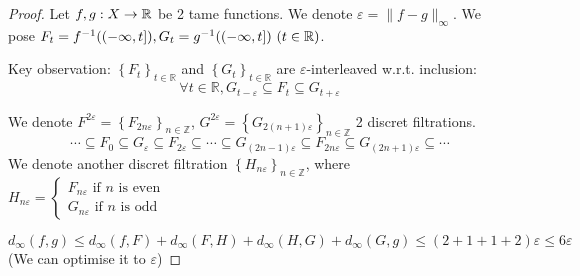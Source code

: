 \begin{proof}
  Let $f, g : X \to \mathbb{R}$ be 2 tame functions. We denote $\varepsilon = \|f-g\|_\infty$.
  We pose $F_t = f^{-1}((-\infty, t]), G_t = g^{-1}((-\infty, t])~(t\in \mathbb{R})$.

  Key observation: $\left\{F_t\right\}_{t \in \mathbb{R}}$ and $\left\{G_t\right\}_{t \in \mathbb{R}}$
  are $\varepsilon$-interleaved w.r.t. inclusion:\\
  $$
  \forall t \in \mathbb{R}, G_{t-\varepsilon} \subseteq F_t \subseteq G_{t+\varepsilon}
  $$

  We denote
  $F^{2 \varepsilon}=\left\{F_{2 n \varepsilon}\right\}_{n \in \mathbb{Z}}$,
  $G^{2 \varepsilon}=\left\{G_{2(n+1) \varepsilon}\right\}_{n \in \mathbb{Z}}$
  2 discret filtrations.
  $$
  \cdots \subseteq F_0 \subseteq G_{\varepsilon} \subseteq F_{2 \varepsilon} \subseteq \cdots \subseteq G_{(2 n-1) \varepsilon} \subseteq F_{2 n \varepsilon} \subseteq G_{(2 n+1) \varepsilon} \subseteq \cdots
  $$
  We denote another discret filtration $\left\{H_{n \varepsilon}\right\}_{n \in \mathbb{Z}}$, where $H_{n \varepsilon}=\left\{\begin{array}{l}F_{n \varepsilon} \text { if } n \text { is even } \\ G_{n \varepsilon} \text { if } n \text { is odd }\end{array}\right.$

  $$
  d_\infty(f, g) \le d_\infty(f, F) + d_\infty(F, H) + d_\infty(H, G) + d_\infty(G, g)
  \le (2+1+1+2)\varepsilon \le 6\varepsilon
  $$
  (We can optimise it to $\varepsilon$)
  
\end{proof}
